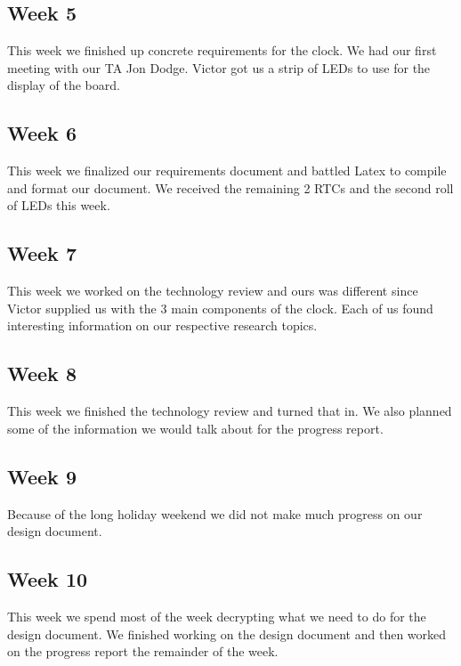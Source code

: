 \documentclass[10pt,draftclsnofoot,onecolumn]{IEEEtran}
\begin{document}
\subsection{Week 5}
This week we finished up concrete requirements for the clock.
We had our first meeting with our TA Jon Dodge.
Victor got us a strip of LEDs to use for the display of the board.

\subsection{Week 6}
This week we finalized our requirements document and battled Latex to compile and format our document.
We received the remaining 2 RTCs and the second roll of LEDs this week.

\subsection{Week 7}
This week we worked on the technology review and ours was different since Victor supplied us with the 3 main components of the clock.
Each of us found interesting information on our respective research topics.

\subsection{Week 8}
This week we finished the technology review and turned that in.
We also planned some of the information we would talk about for the progress report.

\subsection{Week 9}
Because of the long holiday weekend we did not make much progress on our design document.

\subsection{Week 10}
This week we spend most of the week decrypting what we need to do for the design document. 
We finished working on the design document and then worked on the progress report the remainder of the week.
\end{document}
